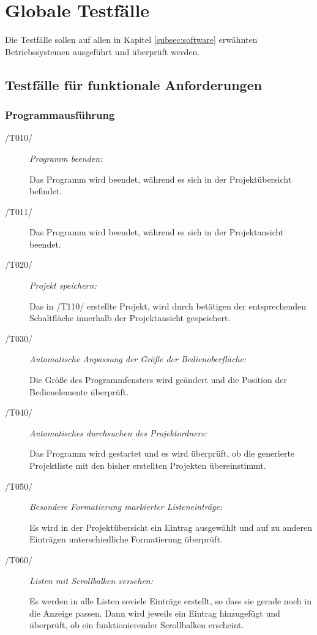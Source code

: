 \section{Globale Testfälle}

Die Testfälle sollen auf allen in Kapitel \ref{subsec:software} erwähnten Betriebssystemen ausgeführt und überprüft werden.


\subsection{Testfälle für funktionale Anforderungen}
	
	\subsubsection{Programmausführung}
	
		\begin{description}

			\item[/T010/] \textit{Programm beenden:}\par Das Programm wird beendet, während es sich in der Projektübersicht befindet.
			
			\item[/T011/] Das Programm wird beendet, während es sich in der Projektansicht beendet.
				
			\item[/T020/] \textit{Projekt speichern:}\par Das in /T110/ erstellte Projekt, wird durch betätigen der entsprechenden Schaltfläche innerhalb der Projektansicht gespeichert. 
				
			\item[/T030/] \textit{Automatische Anpassung der Größe der Bedienoberfläche:}\par Die Größe des Programmfensters wird geändert und die Position der Bedienelemente überprüft.
			
			\item[/T040/] \textit{Automatisches durchsuchen des Projektordners:}\par Das Programm wird gestartet und es wird überprüft, ob die generierte Projektliste mit den bisher erstellten Projekten übereinstimmt.
		
			\item[/T050/] \textit{Besondere Formatierung markierter Listeneinträge:}\par Es wird in der Projektübersicht ein Eintrag ausgewählt und auf zu anderen Einträgen unterschiedliche Formatierung überprüft.
			
			\item[/T060/] \textit{Listen mit Scrollbalken versehen:}\par Es werden in alle Listen soviele Einträge erstellt, so dass sie gerade noch in die Anzeige passen. Dann wird jeweils ein Eintrag hinzugefügt und überprüft, ob ein funktionierender Scrollbalken erscheint.
			
		\end{description}

